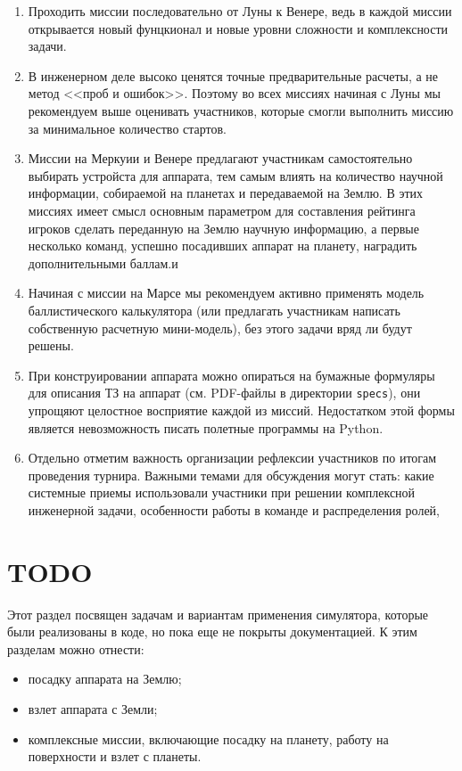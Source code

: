 \documentclass[12pt,a4paper]{article}
\begin{document}
\begin{enumerate}
  \item Проходить миссии последовательно от Луны к Венере, ведь в каждой миссии
    открывается новый фунцкионал и новые уровни сложности и комплексности задачи.
  \item В инженерном деле высоко ценятся точные предварительные расчеты, а не метод <<проб
    и ошибок>>. Поэтому во всех миссиях начиная с Луны мы рекомендуем выше оценивать
    участников, которые смогли выполнить миссию за минимальное количество стартов.
  \item Миссии на Меркуии и Венере предлагают участникам самостоятельно выбирать устройста
    для аппарата, тем самым влиять на количество научной информации, собираемой на
    планетах и передаваемой на Землю. В этих миссиях имеет смысл основным параметром для
    составления рейтинга игроков сделать переданную на Землю научную информацию, а первые
    несколько команд, успешно посадивших аппарат на планету, наградить дополнительными
    баллам.и
  \item Начиная с миссии на Марсе мы рекомендуем активно применять модель баллистического
    калькулятора (или предлагать участникам написать собственную расчетную мини-модель),
    без этого задачи вряд ли будут решены.
  \item При конструировании аппарата можно опираться на бумажные формуляры для описания ТЗ
    на аппарат (см. PDF-файлы в директории \verb'specs'), они упрощяют целостное
    восприятие каждой из миссий. Недостатком этой формы является невозможность писать
    полетные программы на Python.
  \item Отдельно отметим важность организации рефлексии участников по итогам проведения
    турнира. Важными темами для обсуждения могут стать: какие системные приемы
    использовали участники при решении комплексной инженерной задачи, особенности работы
    в команде и распределения ролей, 
\end{enumerate}

\section{TODO}

Этот раздел посвящен задачам и вариантам применения симулятора, которые были реализованы в
коде, но пока еще не покрыты документацией. К этим разделам можно отнести:

\begin{itemize}
\item посадку аппарата на Землю;
\item взлет аппарата с Земли;
\item комплексные миссии, включающие посадку на планету, работу на поверхности и взлет с планеты.
\end{itemize}
\end{document}
